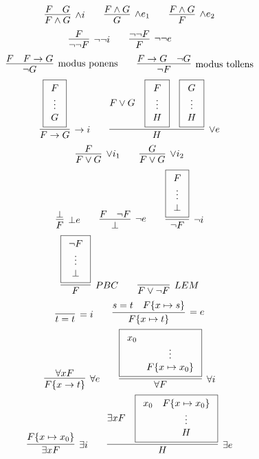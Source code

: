 
\begin{table}[hbt]
\begin{gather*}
	\infer[\land i]{F\land G}{F & G} \qquad
	\infer[\land e_1]{G}{F \land G} \qquad
	\infer[\land e_2]{F}{F \land G} 
	\\
	\infer[\lnot\lnot i]{\lnot\lnot F}{F} \qquad
	\infer[\lnot\lnot e]{F}{\lnot\lnot F} \qquad
	\\
	\infer[\text{modus ponens}]{\lnot G}{F & F\limp G}
		\qquad
	\infer[\text{modus tollens}]{\lnot F}{F\limp G & \lnot G}
	\\
	\infer[\limp i]{F\limp G}{
	\boxed{\begin{array}{c}F\\\vdots\\G\end{array}
	}}
\qquad
\infer[\lor e]{H}{
	F\lor G &
	\boxed{\begin{array}{c}F\\\vdots\\H\end{array}} &
	\boxed{\begin{array}{c}G\\\vdots\\H\end{array}}
}
\\
\infer[\lor i_1]{F\lor G}{F}
	\qquad
\infer[\lor i_2]{F\lor G}{G}
\\
\infer[\bot e]{F}{\bot}
\qquad
\infer[\lnot e]{\bot}{F & \lnot F}
\qquad
\infer[\lnot i]{\lnot F}{
	\boxed{\begin{array}{c}F\\\vdots\\\bot\end{array}}}
\\
\infer[PBC]{F}{
	\boxed{\begin{array}{c}\lnot F\\\vdots\\\bot\end{array}}}
\qquad
\infer[LEM]{F\lor\lnot F}{}
\\
\infer[=i]{t=t}{}
\qquad
\infer[=e]{F\{x\mapsto t\}}{s=t & F\{x\mapsto s\}}
\\
\infer[\forall e]{F\{x\to t\}}{
	\forall x F
}
\qquad
\infer[\forall i]{\forall F}{
	\boxed{\begin{array}{cc}x_0\\&\vdots\\&F\{x\mapsto x_0\}\end{array}}
}
\\
\infer[\exists i]{\exists x F}{
	F\{x\mapsto x_0 \}
}
\qquad
\infer[\exists e]{H}{
	\exists x F &
	\boxed{\begin{array}{cc}x_0&F\{x\mapsto x_0 \}\\&\vdots\\&H\end{array}}
}
\end{gather*}
\caption{Natural Deduction Rules}
\label{tab:natural:deduction:rules}
\end{table}